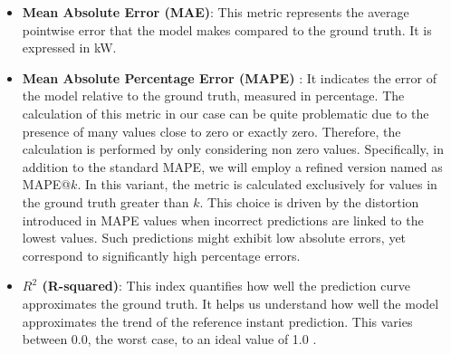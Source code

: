 \begin{itemize}
	\item \textbf{Mean Absolute Error (MAE)}: This metric represents the average pointwise error that the model makes compared to the ground truth. It is expressed in kW.
	\item \textbf{Mean Absolute Percentage Error (MAPE)} \cite{metrics}: It indicates the error of the model relative to the ground truth, measured in percentage. The calculation of this metric in our case can be quite problematic due to the presence of many values close to zero or exactly zero. Therefore, the calculation is performed by only considering non zero values. Specifically, in addition to the standard MAPE, we will employ a refined version named as MAPE@$k$. In this variant, the metric is calculated exclusively for values in the ground truth greater than $k$. This choice is driven by the distortion introduced in MAPE values when incorrect predictions are linked to the lowest values. Such predictions might exhibit low absolute errors, yet correspond to significantly high percentage errors.
	\item \textbf{$R^2$ (R-squared)}: This index quantifies how well the prediction curve approximates the ground truth. It helps us understand how well the model approximates the trend of the reference instant prediction. This varies between 0.0, the worst case, to an ideal value of 1.0 \cite{metrics}.

\end{itemize}

